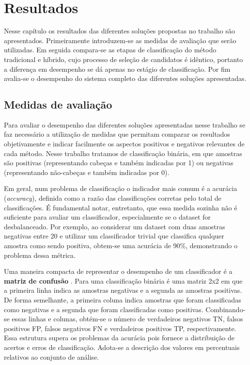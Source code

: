 \chapter{Resultados}
Nesse capítulo os resultados das diferentes soluções propostas no trabalho são apresentados. Primeiramente introduzem-se as medidas de avaliação que serão utilizadas. Em seguida compara-se as etapas de classificação do método tradicional e híbrido, cujo processo de seleção de candidatos é idêntico, portanto a diferença em desempenho se dá apenas no estágio de classificação. Por fim avalia-se o desempenho do sistema completo das diferentes soluções apresentadas.

\section{Medidas de avaliação}
Para avaliar o desempenho das diferentes soluções apresentadas nesse trabalho se faz necessário a utilização de medidas que permitam comparar os resultados objetivamente e indicar facilmente os aspectos positivos e negativos relevantes de cada método. Nesse trabalho tratamos de classificação binária, em que amostras são positivas (representando cabeças e também indicadas por 1) ou negativas (representando não-cabeças e também indicadas por 0). 

Em geral, num problema de classificação o indicador mais comum é a acurácia (\textit{accuracy}), definida \cite{evaluationMetrics} como a razão das classificações corretas pelo total de classificações. É fundamental notar, entretanto, que essa medida sozinha não é suficiente para avaliar um classificador, especialmente se o dataset for desbalanceado. Por exemplo, ao considerar um dataset com duas amostras negativas entre 20 e utilizar um classificador trivial que classifica qualquer amostra como sendo positiva, obtem-se uma acurácia de 90\%, demonstrando o problema dessa métrica.

Uma maneira compacta de representar o desempenho de um classificador é a \textbf{matriz de confusão} \cite{evaluationMetrics}. Para uma classificação binária é uma matriz 2x2 em que a primeira linha indica as amostras negativas e a segunda as amostras positivas. De forma semelhante, a primeira coluna indica amostras que foram classificadas como negativas e a segunda que foram classificadas como positivas. Combinando-se essas linhas e colunas, obtém-se o número de verdadeiros negativos TN, falsos positivos FP, falsos negativos FN e verdadeiros positivos TP, respectivamente. Essa estrutura supera os problemas da acurácia pois fornece a distribuição de acertos e erros de classificação. Adota-se a descrição dos valores em percentuais relativos ao conjunto de análise.

